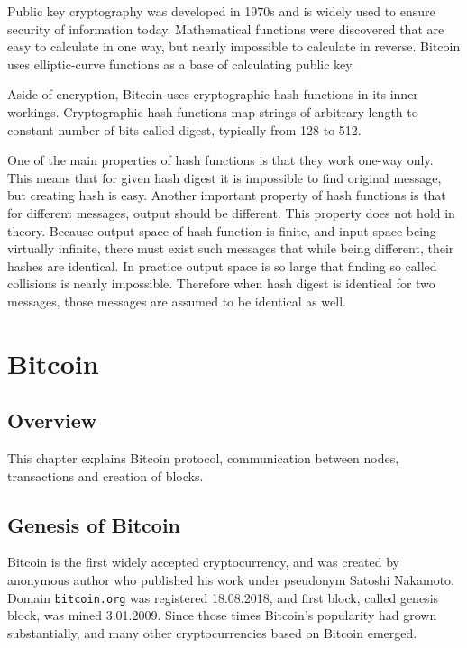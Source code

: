 \documentclass[12pt, en, eng, oneside, final]{mgr}
\begin{document}
Public key cryptography was developed in 1970s and is widely used to ensure security of information today. Mathematical functions were discovered that are easy to calculate in one way, but nearly impossible to calculate in reverse. Bitcoin uses elliptic-curve functions as a base of calculating public key.\cite{bartek}

Aside of encryption, Bitcoin uses cryptographic hash functions in its inner workings. Cryptographic hash functions map strings of arbitrary length to constant number of bits called digest, typically from 128 to 512. 

One of the main properties of hash functions is that they work one-way only. This means that for given hash digest it is impossible to find original message, but creating hash is easy. Another important property of hash functions is that for different messages, output should be different. This property does not hold in theory. Because output space of hash function is finite, and input space being virtually infinite, there must exist such messages that while being different, their hashes are identical. In practice output space is so large that finding so called collisions is nearly impossible. Therefore when hash digest is identical for two messages, those messages are assumed to be identical as well.  \cite{hash-functions}


\chapter{Bitcoin}

\section{Overview}

This chapter explains Bitcoin protocol, communication between nodes, transactions and creation of blocks.

\section{Genesis of Bitcoin}
Bitcoin is the first widely accepted cryptocurrency, and was created by anonymous author who published his work under pseudonym Satoshi Nakamoto. Domain \texttt{bitcoin.org} was registered 18.08.2018, and first block, called genesis block, was mined 3.01.2009. Since those times Bitcoin's popularity had grown substantially, and many other cryptocurrencies based on Bitcoin emerged. \cite{bitcoin-history}
\end{document}
